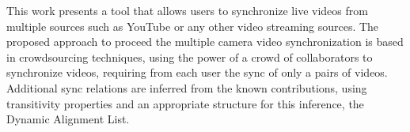 This work presents a tool that allows users to synchronize live videos from multiple sources such as YouTube or any other video streaming sources. The proposed approach to proceed the multiple camera video synchronization is based in crowdsourcing techniques, using the power of a crowd of collaborators to synchronize videos, requiring from each user the sync of only a pairs of videos. Additional sync relations are inferred from the known contributions, using transitivity properties and an appropriate structure for this inference, the Dynamic Alignment List.




